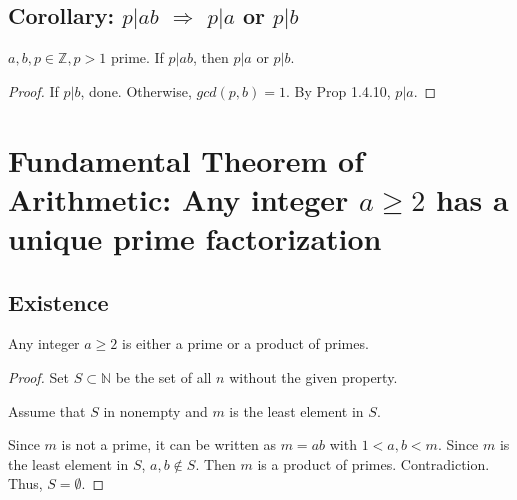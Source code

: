 \documentclass[11pt]{elegantbook}
\begin{document}
\subsection{Corollary: $p|ab$ $\Rightarrow	$ $p|a$ or $p|b$}
\begin{corollary}
    $a,b,p\in\mathbb{Z}, p>1$ prime. If $p|ab$, then $p|a$ or $p|b$.
\end{corollary}
\begin{proof}
If $p|b$, done. Otherwise, $gcd(p,b)=1$. By Prop 1.4.10, $p|a$.
\end{proof}


\section{Fundamental Theorem of Arithmetic: Any integer
$a \geq 2$ has a unique prime factorization}

\subsection{Existence}
\begin{lemma}
    Any integer $a \geq 2$ is either a prime or a product of primes.
\end{lemma}
\begin{proof}
    Set $S\subset \mathbb{N}$ be the set of all $n$ without the given property.
    
    Assume that $S$ in nonempty and $m$ is the least element in $S$.

    Since $m$ is not a prime, it can be written as $m=ab$ with $1<a,b<m$. Since $m$ is the least element in $S$, $a,b\notin S$. Then $m$ is a product of primes. Contradiction. Thus, $S=\emptyset$.
\end{proof}
\end{document}
